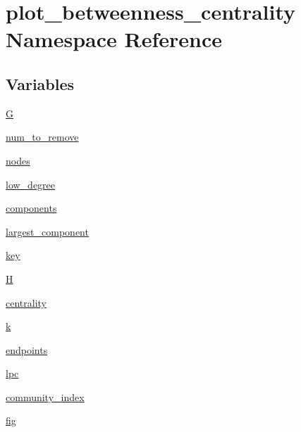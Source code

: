 \hypertarget{namespaceplot__betweenness__centrality}{}\section{plot\+\_\+betweenness\+\_\+centrality Namespace Reference}
\label{namespaceplot__betweenness__centrality}
\subsection*{Variables}
\begin{DoxyCompactItemize}
\item 
\hyperlink{namespaceplot__betweenness__centrality_a984d75cf66c91306c55609883a813289}{G}
\item 
\hyperlink{namespaceplot__betweenness__centrality_ab1925730646bb9c7ee70b09b1bd64551}{num\+\_\+to\+\_\+remove}
\item 
\hyperlink{namespaceplot__betweenness__centrality_aaa5dc4b8ed7508048a2011f2b0edaed2}{nodes}
\item 
\hyperlink{namespaceplot__betweenness__centrality_adeba81b49102bd2268de2497a8ccd436}{low\+\_\+degree}
\item 
\hyperlink{namespaceplot__betweenness__centrality_a27a30e3a834cbe948314f44f95593fb0}{components}
\item 
\hyperlink{namespaceplot__betweenness__centrality_a78195a7f2351bf76021a12dadd304a37}{largest\+\_\+component}
\item 
\hyperlink{namespaceplot__betweenness__centrality_af36ad037f1e36a775b630a26c5e2a6a1}{key}
\item 
\hyperlink{namespaceplot__betweenness__centrality_a7e246c33ee4e1da7210aa7c2071d4412}{H}
\item 
\hyperlink{namespaceplot__betweenness__centrality_a1e0ff673192f6f66aea3c1e8129594a3}{centrality}
\item 
\hyperlink{namespaceplot__betweenness__centrality_a37de2516eeeedf2ee93189cb8fb8bd4b}{k}
\item 
\hyperlink{namespaceplot__betweenness__centrality_afd871a7e29b1d37c53cc854a2f77d74d}{endpoints}
\item 
\hyperlink{namespaceplot__betweenness__centrality_ac012387565f09c9d90b3d9563c19b346}{lpc}
\item 
\hyperlink{namespaceplot__betweenness__centrality_a9c2a0376b1ca4ad07b6e23fa50ce1e54}{community\+\_\+index}
\item 
\hyperlink{namespaceplot__betweenness__centrality_a2f94b2942737d8149bab7c64c4c13b5c}{fig}

\end{DoxyCompactItemize}
